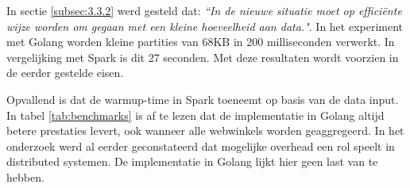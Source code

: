 In sectie \ref{subsec:3.3.2} werd gesteld dat: \textit{``In de nieuwe situatie moet op efficiënte wijze worden om gegaan met een kleine hoeveelheid aan data."}. In het experiment met Golang worden kleine partities van 68KB in 200 milliseconden verwerkt. In vergelijking met Spark is dit 27 seconden. Met deze resultaten wordt voorzien in de eerder gestelde eisen.

Opvallend is dat de warmup-time in Spark toeneemt op basis van de data input. In tabel \ref{tab:benchmarks} is af te lezen dat de implementatie in Golang altijd betere prestaties levert, ook wanneer alle webwinkels worden geaggregeerd. In het onderzoek werd al eerder geconstateerd dat mogelijke overhead een rol speelt in distributed systemen. De implementatie in Golang lijkt hier geen last van te hebben.

